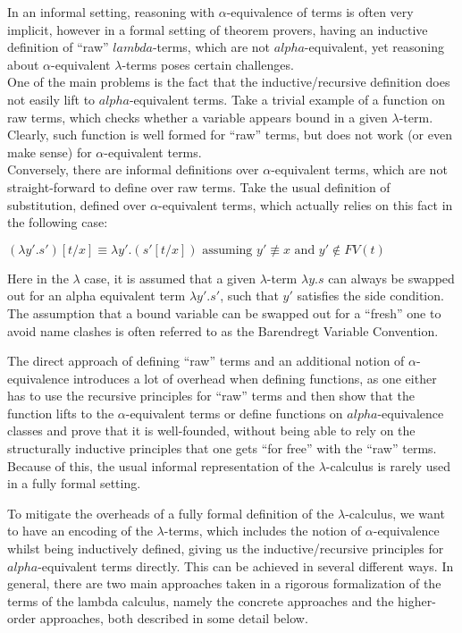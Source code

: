 \documentclass[a4paper, 12pt, twoside]{style/ociamthesis}
\theoremstyle{plain}
\theoremstyle{definition}
\theoremstyle{remark}
\begin{document}
In an informal setting, reasoning with \(\alpha\)-equivalence of terms
is often very implicit, however in a formal setting of theorem provers,
having an inductive definition of ``raw'' \(lambda\)-terms, which are
not \(alpha\)-equivalent, yet reasoning about \(\alpha\)-equivalent
\(\lambda\)-terms poses certain challenges.\\
One of the main problems is the fact that the inductive/recursive
definition does not easily lift to \(alpha\)-equivalent terms. Take a
trivial example of a function on raw terms, which checks whether a
variable appears bound in a given \(\lambda\)-term. Clearly, such
function is well formed for ``raw'' terms, but does not work (or even
make sense) for \(\alpha\)-equivalent terms.\\
Conversely, there are informal definitions over \(\alpha\)-equivalent
terms, which are not straight-forward to define over raw terms. Take the
usual definition of substitution, defined over \(\alpha\)-equivalent
terms, which actually relies on this fact in the following case:

\begin{center}
$(\lambda y'. s')[t/x] \equiv \lambda y'.(s'[t/x]) \text{ assuming } y' \not\equiv x\text{ and }y' \not\in FV(t)$
\end{center}

Here in the \(\lambda\) case, it is assumed that a given
\(\lambda\)-term \(\lambda y. s\) can always be swapped out for an alpha
equivalent term \(\lambda y'. s'\), such that \(y'\) satisfies the side
condition. The assumption that a bound variable can be swapped out for a
``fresh'' one to avoid name clashes is often referred to as the
Barendregt Variable Convention.

The direct approach of defining ``raw'' terms and an additional notion
of \(\alpha\)-equivalence introduces a lot of overhead when defining
functions, as one either has to use the recursive principles for ``raw''
terms and then show that the function lifts to the \(\alpha\)-equivalent
terms or define functions on \(alpha\)-equivalence classes and prove
that it is well-founded, without being able to rely on the structurally
inductive principles that one gets ``for free'' with the ``raw''
terms.\\
Because of this, the usual informal representation of the
\(\lambda\)-calculus is rarely used in a fully formal setting.

To mitigate the overheads of a fully formal definition of the
\(\lambda\)-calculus, we want to have an encoding of the
\(\lambda\)-terms, which includes the notion of \(\alpha\)-equivalence
whilst being inductively defined, giving us the inductive/recursive
principles for \(alpha\)-equivalent terms directly. This can be achieved
in several different ways. In general, there are two main approaches
taken in a rigorous formalization of the terms of the lambda calculus,
namely the concrete approaches and the higher-order approaches, both
described in some detail below.
\end{document}
